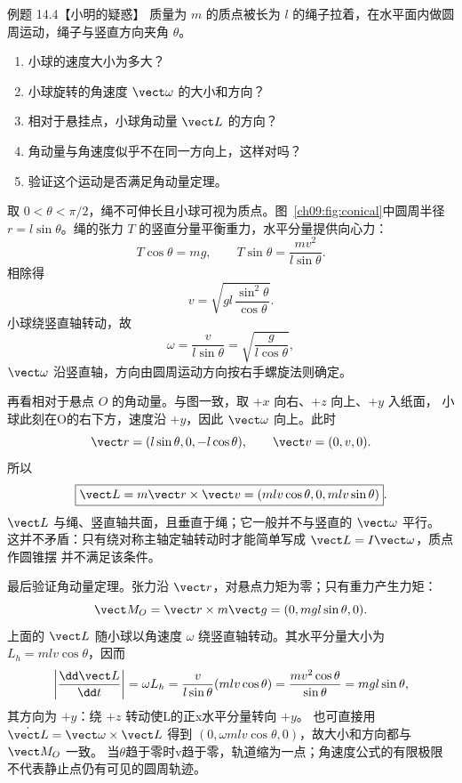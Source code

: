 \Needspace{0.42\textheight}
\begin{origexamplebox}{例题 14.4【小明的疑惑】}
质量为 $m$ 的质点被长为 $l$ 的绳子拉着，在水平面内做圆周运动，绳子与竖直方向夹角
$\theta$。
\begin{enumerate}[label=(\arabic*),leftmargin=2.2em]
  \item 小球的速度大小为多大？
  \item 小球旋转的角速度 $\vect\omega$ 的大小和方向？
  \item 相对于悬挂点，小球角动量 $\vect L$ 的方向？
  \item 角动量与角速度似乎不在同一方向上，这样对吗？
  \item 验证这个运动是否满足角动量定理。
\end{enumerate}
\conicalPendulumDiagram
\end{origexamplebox}

\begin{xesolution}
取 $0<\theta<\pi/2$，绳不可伸长且小球可视为质点。图~\ref{ch09:fig:conical}中圆周半径
$r=l\sin\theta$。绳的张力 $T$ 的竖直分量平衡重力，水平分量提供向心力：
\[
 T\cos\theta=mg,
 \qquad
 T\sin\theta=\frac{mv^2}{l\sin\theta}.
\]
相除得
\[
 \boxed{v=\sqrt{gl\,\frac{\sin^2\theta}{\cos\theta}}}.
\]
小球绕竖直轴转动，故
\[
 \boxed{\omega=\frac{v}{l\sin\theta}
 =\sqrt{\frac{g}{l\cos\theta}}},
\]
$\vect\omega$ 沿竖直轴，方向由圆周运动方向按右手螺旋法则确定。

再看相对于悬点 $O$ 的角动量。与图一致，取 $+x$ 向右、$+z$ 向上、$+y$ 入纸面，
小球此刻在O的右下方，速度沿 $+y$，因此 $\vect\omega$ 向上。此时
\[
 \vect r=(l\sin\theta,0,-l\cos\theta),\qquad
 \vect v=(0,v,0).
\]
所以
\[
 \boxed{\vect L=m\vect r\times\vect v
 =(mlv\cos\theta,0,mlv\sin\theta)}.
\]
$\vect L$ 与绳、竖直轴共面，且垂直于绳；它一般并不与竖直的 $\vect\omega$ 平行。
这并不矛盾：只有绕对称主轴定轴转动时才能简单写成 $\vect L=I\vect\omega$，质点作圆锥摆
并不满足该条件。

最后验证角动量定理。张力沿 $\vect r$，对悬点力矩为零；只有重力产生力矩：
\[
 \vect M_O=\vect r\times m\vect g=(0,mgl\sin\theta,0).
\]
上面的 $\vect L$ 随小球以角速度 $\omega$ 绕竖直轴转动。其水平分量大小为
$L_h=mlv\cos\theta$，因而
\[
 \left|\frac{\dd\vect L}{\dd t}\right|
 =\omega L_h
 =\frac{v}{l\sin\theta}(mlv\cos\theta)
 =\frac{mv^2\cos\theta}{\sin\theta}
 =mgl\sin\theta,
\]
其方向为 $+y$：绕 $+z$ 转动使L的正x水平分量转向 $+y$。
也可直接用 $\dot{\vect L}=\vect\omega\times\vect L$
得到 $(0,\omega mlv\cos\theta,0)$，故大小和方向都与 $\vect M_O$ 一致。
当$\theta$趋于零时v趋于零，轨道缩为一点；角速度公式的有限极限不代表静止点仍有可见的圆周轨迹。
\end{xesolution}

